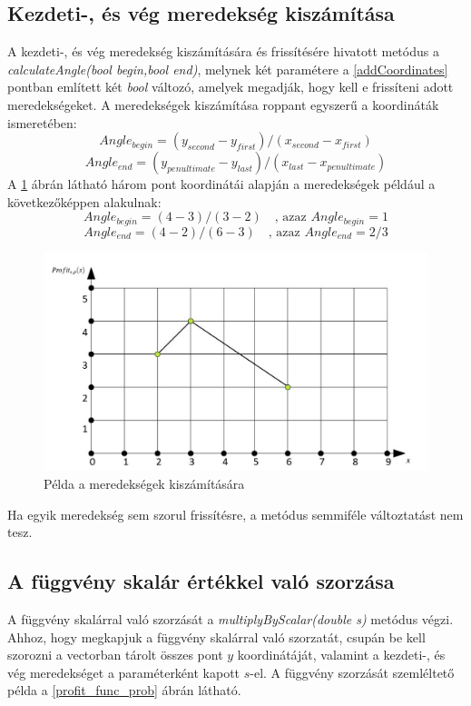 \documentclass [12pt]{report}
\begin{document}
\subsection{Kezdeti-, és vég meredekség kiszámítása} \label{calculateAngle}
A  kezdeti-, és vég meredekség kiszámítására és frissítésére hivatott metódus a \textit{calculateAngle(bool begin,bool end)}, melynek két paramétere a \ref{addCoordinates} pontban említett két \textit{bool} változó, amelyek megadják, hogy kell e frissíteni adott meredekségeket. A meredekségek kiszámítása roppant egyszerű a koordináták ismeretében:
$$Angle_{begin}=(y_{second}-y_{first}) / (x_{second}-x_{first})$$
$$Angle_{end}=(y_{penultimate}-y_{last}) / (x_{last}-x_{penultimate})$$
A \ref{calculate angle} ábrán látható három pont koordinátái alapján a meredekségek például a következőképpen alakulnak: 
$$Angle_{begin}=(4-3) / (3-2)\quad \text{, azaz } Angle_{begin}=1$$
$$Angle_{end}=(4-2) / (6-3)\quad \text{, azaz } Angle_{end}=2/3$$
\begin{figure}[H]
\begin{center}
\includegraphics[scale=0.5]{calculate_angle}
\caption{Példa a meredekségek kiszámítására}
\label{calculate angle}
\end{center}
\end{figure}
Ha egyik meredekség sem szorul frissítésre, a metódus semmiféle változtatást nem tesz.
\subsection{A függvény skalár értékkel való szorzása} \label{multiplyByScalar}
A függvény skalárral való szorzását a \textit{multiplyByScalar(double s)} metódus végzi. Ahhoz, hogy megkapjuk a függvény skalárral való szorzatát, csupán be kell szorozni a vectorban tárolt összes pont $y$ koordinátáját, valamint a kezdeti-, és vég meredekséget a paraméterként kapott $s$-el. A függvény szorzását szemléltető példa a \ref{profit_func_prob} ábrán látható.
\end{document}
